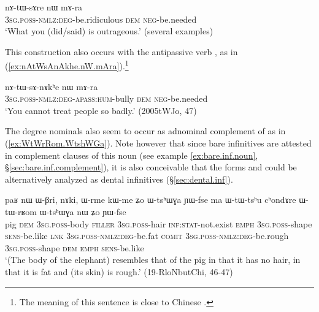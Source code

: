 \begin{exe}
\ex \label{ex:nAtWsAre.nW.mAra}
\gll  nɤ-tɯ-sɤre nɯ mɤ-ra \\
\textsc{3sg}.\textsc{poss}-\textsc{nmlz}:\textsc{deg}-be.ridiculous \textsc{dem} \textsc{neg}-be.needed \\
\glt `What you (did/said) is outrageous.' (several examples)
\end{exe}

This construction also occurs with the antipassive verb , as in (\ref{ex:nAtWsAnAkhe.nW.mAra}).\footnote{The meaning of this sentence is close to Chinese .
}

\begin{exe}
\ex \label{ex:nAtWsAnAkhe.nW.mAra}
\gll nɤ-tɯ-sɤ-nɤkʰe nɯ mɤ-ra \\
\textsc{3sg}.\textsc{poss}-\textsc{nmlz}:\textsc{deg}-\textsc{apass}:\textsc{hum}-bully \textsc{dem} \textsc{neg}-be.needed \\
\glt `You cannot treat people so badly.'  (2005tWJo, 47)
\end{exe}

The degree nominals also seem to occur as adnominal complement of  as in (\ref{ex:WtWrRom.WtshWGa}). Note however that since bare infinitives are attested in complement clauses of this noun (see example \ref{ex:bare.inf.noun}, §\ref{sec:bare.inf.complement}), it is also conceivable that the forms  and  could be alternatively analyzed as dental infinitives (§\ref{sec:dental.inf}).

\begin{exe}
\ex \label{ex:WtWrRom.WtshWGa}
\gll  paʁ nɯ ɯ-βri, nɤki, ɯ-rme kɯ-me ʑo ɯ-tsʰɯɣa ɲɯ-fse ma ɯ-tɯ-tsʰu cʰondɤre ɯ-tɯ-rʁom ɯ-tsʰɯɣa nɯ ʑo ɲɯ-fse \\
pig \textsc{dem} \textsc{3sg}.\textsc{poss}-body \textsc{filler} \textsc{3sg}.\textsc{poss}-hair \textsc{inf}:\textsc{stat}-not.exist \textsc{emph} \textsc{3sg}.\textsc{poss}-shape \textsc{sens}-be.like \textsc{lnk} \textsc{3sg}.\textsc{poss}-\textsc{nmlz}:\textsc{deg}-be.fat \textsc{comit} \textsc{3sg}.\textsc{poss}-\textsc{nmlz}:\textsc{deg}-be.rough \textsc{3sg}.\textsc{poss}-shape \textsc{dem} \textsc{emph} \textsc{sens}-be.like \\
\glt `(The body of the elephant) resembles that of the pig in that it has no hair, in that it is fat and (its skin) is rough.' (19-RloNbutChi, 46-47)
\end{exe}

